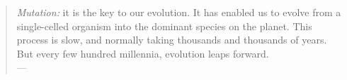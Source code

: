 \null
\vfill
\begin{quote}
	\emph{Mutation:} it is the key to our evolution. It has enabled us to evolve
	from a single-celled organism into the dominant species on the planet. This
	process is slow, and normally taking thousands and thousands of years. But
	every few hundred millennia, evolution leaps forward.\\
	\null\hfill--- \citet{singer2000}
\end{quote}
